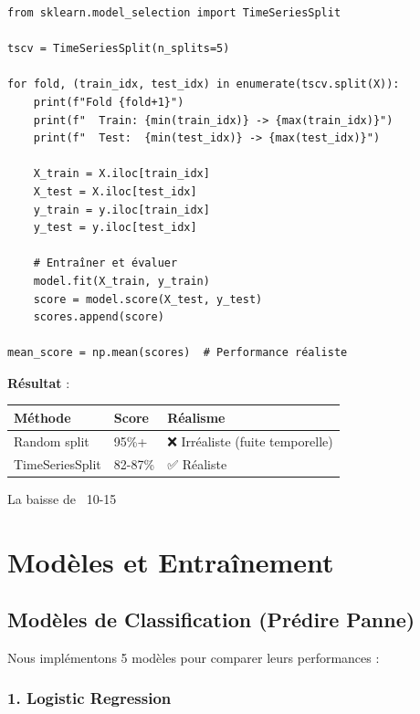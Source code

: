 \documentclass[12pt,a4paper,french]{article}
\begin{document}
\begin{lstlisting}
from sklearn.model_selection import TimeSeriesSplit

tscv = TimeSeriesSplit(n_splits=5)

for fold, (train_idx, test_idx) in enumerate(tscv.split(X)):
    print(f"Fold {fold+1}")
    print(f"  Train: {min(train_idx)} -> {max(train_idx)}")
    print(f"  Test:  {min(test_idx)} -> {max(test_idx)}")
    
    X_train = X.iloc[train_idx]
    X_test = X.iloc[test_idx]
    y_train = y.iloc[train_idx]
    y_test = y.iloc[test_idx]
    
    # Entraîner et évaluer
    model.fit(X_train, y_train)
    score = model.score(X_test, y_test)
    scores.append(score)

mean_score = np.mean(scores)  # Performance réaliste
\end{lstlisting}

\textbf{Résultat} :
\begin{center}
\begin{tabular}{|l|l|l|}
\hline
\textbf{Méthode} & \textbf{Score} & \textbf{Réalisme} \\
\hline
Random split & 95\%+ & ❌ Irréaliste (fuite temporelle) \\
TimeSeriesSplit & 82-87\% & ✅ Réaliste \\
\hline
\end{tabular}
\end{center}

La baisse de ~10-15%

\section{Modèles et Entraînement}

\subsection{Modèles de Classification (Prédire Panne)}

Nous implémentons 5 modèles pour comparer leurs performances :

\subsubsection{1. Logistic Regression}
\end{document}
